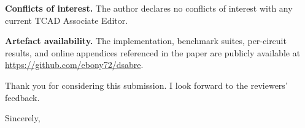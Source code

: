 \documentclass[11pt]{letter}
\begin{document}
\begin{letter}{}
\noindent\textbf{Conflicts of interest.}
The author declares no conflicts of interest with any current TCAD
Associate Editor.

\noindent\textbf{Artefact availability.}
The implementation, benchmark suites, per-circuit results, and
online appendices referenced in the paper are publicly available at
\url{https://github.com/ebony72/dsabre}.

Thank you for considering this submission.  I look forward to the
reviewers' feedback.

\closing{Sincerely,}

\end{letter}
\end{document}

